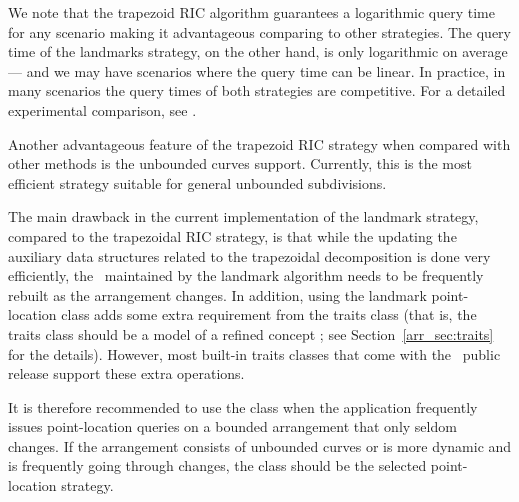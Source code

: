 We note that the trapezoid RIC algorithm guarantees a
logarithmic query time for any scenario
making it advantageous comparing to other strategies.
The query time of the landmarks strategy, on the other hand,
 is only logarithmic on average --- and we may have
scenarios where the query time can be linear. 
In practice, in many scenarios
the query times of both strategies are competitive. For a detailed
experimental comparison, see \cite{hh-esplp-08}.

Another advantageous feature of the trapezoid RIC strategy
when compared with other methods
is the unbounded curves support. 
Currently, this is the most efficient strategy 
suitable for general unbounded subdivisions.


The main drawback in the current implementation of the landmark
strategy, compared to the trapezoidal RIC strategy, is that while
the updating the auxiliary data structures
related to the trapezoidal decomposition is done very efficiently,
the \kdtree\ maintained by the landmark algorithm needs to be
frequently rebuilt as the arrangement changes. In addition, using
the landmark point-location class adds some extra requirement
from the traits class (that is, the traits class should be a model
of a refined concept ; see
Section~\ref{arr_sec:traits} for the details). However, most
built-in traits classes that come with the \cgal\ public release
support these extra operations.

It is therefore recommended to use the
 class when the application
frequently issues point-location queries on a bounded
arrangement that only seldom changes. If the arrangement 
consists of unbounded curves or is more
dynamic and is frequently going through changes, the
 class should be the
selected point-location strategy.

